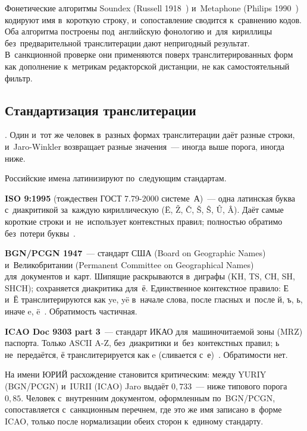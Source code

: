 Фонетические алгоритмы Soundex (Russell 1918~\cite{russell-soundex})
и~Metaphone (Philips 1990~\cite{philips-metaphone}) кодируют имя в~короткую
строку, и~сопоставление сводится к~сравнению кодов. Оба алгоритма построены
под~английскую фонологию и~для~кириллицы без~предварительной транслитерации
дают непригодный результат. В~санкционной проверке они применяются поверх
транслитерированных форм как дополнение к~метрикам редакторской дистанции, не как
самостоятельный фильтр.

\subsection*{Стандартизация транслитерации}\label{sec:sanctions-translit}

. Один и~тот же человек в~разных формах
транслитерации даёт разные строки, и~Jaro-Winkler возвращает разные значения~---
иногда выше порога, иногда ниже.

Российские имена латинизируют по~следующим стандартам.

\textbf{ISO 9:1995} (тождествен ГОСТ 7.79-2000 системе~А)~--- одна латинская
буква с~диакритикой за~каждую кириллическую (Ë, Ž, Č, Š, Ŝ, Û, Â). Даёт самые
короткие строки и~не~использует контекстных правил; полностью обратимо без~потери
буквы~\cite{iso-9}.

\textbf{BGN/PCGN 1947}~--- стандарт США (Board on Geographic Names)
и~Великобритании (Permanent Committee on Geographical Names) для~документов
и~карт. Шипящие раскрываются в~диграфы (KH, TS, CH, SH, SHCH); сохраняется
диакритика для~ё. Единственное контекстное правило: Е и~Ё транслитерируются
как ye, yë в~начале слова, после гласных и~после й, ъ, ь, иначе e,
ë~\cite{bgn-pcgn}. Обратимость частичная.

\textbf{ICAO Doc 9303 part 3}~--- стандарт ИКАО для~машиночитаемой зоны (MRZ)
паспорта. Только ASCII A-Z, без~диакритики и~без~контекстных правил; ь
не~передаётся, ё транслитерируется как e (сливается с~е)~\cite{icao-9303}.
Обратимости нет.

На имени ЮРИЙ расхождение становится критическим: между YURIY (BGN/PCGN)
и~IURII (ICAO) Jaro выдаёт $0{,}733$~--- ниже типового порога $0{,}85$. Человек
с~внутренним документом, оформленным по~BGN/PCGN, сопоставляется
с~санкционным перечнем, где это же имя записано в~форме ICAO, только после
нормализации обеих сторон к~единому стандарту.

